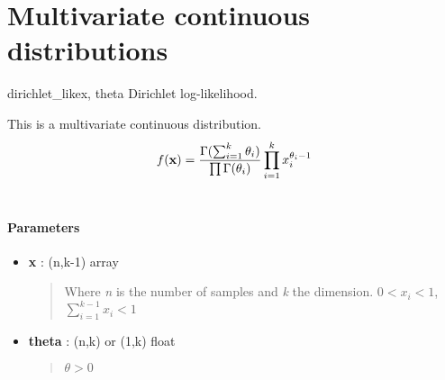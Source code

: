 \section{Multivariate continuous distributions}

\hypertarget{pymc.distributions.dirichlet_like}{}\begin{funcdesc}{dirichlet\_like}{x, theta}
Dirichlet log-likelihood.

This is a multivariate continuous distribution.
\begin{gather}
\begin{split}f(\mathbf{x}) = \frac{\Gamma(\sum_{i=1}^k \theta_i)}{\prod \Gamma(\theta_i)} \prod_{i=1}^k x_i^{\theta_i - 1}\end{split}\notag\\\begin{split}\end{split}\notag
\end{gather}\paragraph{Parameters}\begin{itemize}

\item[] \textbf{x} : (n,k-1) array
\begin{quote}

Where \emph{n} is the number of samples and \emph{k} the dimension.
$0 < x_i < 1$,  $\sum_{i=1}^{k-1} x_i < 1$
\end{quote}

\item[] \textbf{theta} : (n,k) or (1,k) float
\begin{quote}

$\theta > 0$
\end{quote}
\end{itemize}
\end{funcdesc}

